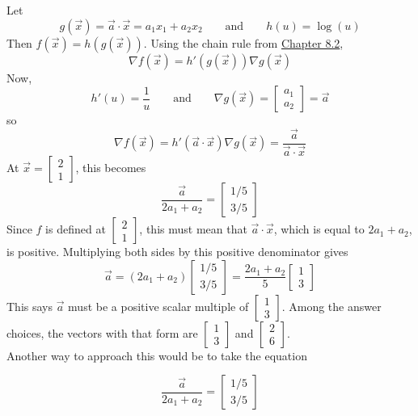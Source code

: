 \documentclass[11pt]{article}
\begin{document}
\begin{prob}
\begin{subprob}
\begin{solution}
Let
\[
g(\vec{x})=\vec{a}\cdot\vec{x}=a_1x_1+a_2x_2
\qquad\text{and}\qquad
h(u)=\log(u)
\]
Then $f(\vec{x})=h(g(\vec{x}))$. Using the chain rule from \href{https://notes.eecs245.org/gradients/gradients-matrix-vector-operations/\#chain-rule-for-vector-to-scalar-functions}{Chapter 8.2},
\[
\nabla f(\vec{x})
=
h'(g(\vec{x}))\nabla g(\vec{x})
\]
Now,
\[
h'(u)=\frac{1}{u}
\qquad\text{and}\qquad
\nabla g(\vec{x})=
\begin{bmatrix}a_1\\a_2\end{bmatrix}
=\vec{a}
\]
so
\[
\nabla f(\vec{x})
=
h'(\vec a \cdot \vec x) \nabla g(\vec{x}) =
\frac{\vec{a}}{\vec{a}\cdot\vec{x}}
\]
At $\vec{x}=\begin{bmatrix}2\\1\end{bmatrix}$, this becomes
\[
\frac{\vec{a}}{2a_1+a_2}
=
\begin{bmatrix}1/5\\3/5\end{bmatrix}
\]
Since $f$ is defined at $\begin{bmatrix}2\\1\end{bmatrix}$, this must mean that $\vec a \cdot \vec x$, which is equal to $2a_1 + a_2$, is positive. Multiplying both sides by this positive denominator gives
\[
\vec{a}
=
(2a_1+a_2)
\begin{bmatrix}1/5\\3/5\end{bmatrix}
=
\frac{2a_1+a_2}{5}
\begin{bmatrix}1\\3\end{bmatrix}
\]
This says $\vec{a}$ must be a positive scalar multiple of $\begin{bmatrix}1\\3\end{bmatrix}$. Among the answer choices, the vectors with that form are $\begin{bmatrix}1\\3\end{bmatrix}$ and $\begin{bmatrix}2\\6\end{bmatrix}$. \\

Another way to approach this would be to take the equation

$$\frac{\vec a}{2a_1+a_2} = \begin{bmatrix}1/5\\3/5\end{bmatrix}$$


\end{solution}
\end{subprob}
\end{prob}
\end{document}
